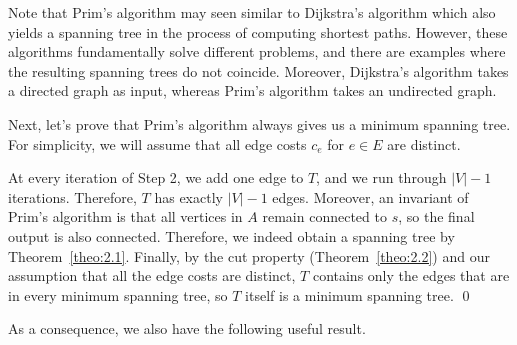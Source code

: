 \begin{center}
\end{center}
\vspace{-0.25cm}
Note that Prim's algorithm may seen similar to Dijkstra's algorithm 
which also yields a spanning tree in the process of computing shortest paths. 
However, these algorithms fundamentally solve different problems, and 
there are examples where the resulting spanning trees do not coincide. 
Moreover, Dijkstra's algorithm takes a directed graph as input, 
whereas Prim's algorithm takes an undirected graph. 

Next, let's prove that Prim's algorithm always gives us a minimum spanning tree. 
For simplicity, we will assume that all edge costs $c_e$ for 
$e \in E$ are distinct. 

\begin{pf}
    At every iteration of Step 2, we add one edge to $T$, and we run 
    through $|V| - 1$ iterations. Therefore, $T$ has exactly 
    $|V| - 1$ edges. Moreover, an invariant of Prim's algorithm is that 
    all vertices in $A$ remain connected to $s$, so the final output is 
    also connected. Therefore, we indeed obtain a spanning tree by 
    Theorem~\ref{theo:2.1}. Finally, by the cut property (Theorem~\ref{theo:2.2})
    and our assumption that all the edge costs are distinct, $T$ contains 
    only the edges that are in every minimum spanning tree, so $T$ 
    itself is a minimum spanning tree. \qed 
\end{pf}\vspace{-0.25cm}

As a consequence, we also have the following useful result. 

